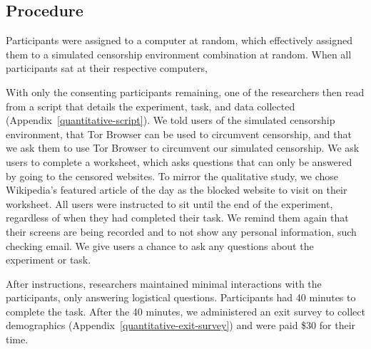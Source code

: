 \documentclass[USenglish,oneside,twocolumn]{article}
\begin{document}
\subsection{Procedure}
{\color {blue} 
Participants were assigned to a computer at random, which effectively assigned them to a simulated censorship environment combination at random. When all participants sat at their respective computers, 

With only the consenting participants remaining, one of the researchers then read from a script that details the experiment, task, and data collected (Appendix~\ref{quantitative-script}). We told users of the simulated censorship environment, that Tor Browser can be used to circumvent censorship, and that we ask them to use Tor Browser to circumvent our simulated censorship. We ask users to complete a worksheet, which asks questions that can only be answered by going to the censored websites. To mirror the qualitative study, we chose Wikipedia's featured article of the day as the blocked website to visit on their worksheet. All users were instructed to sit until the end of the experiment, regardless of when they had completed their task. We remind them again that their screens are being recorded and to not show any personal information, such checking email. We give users a chance to ask any questions about the experiment or task. 

After instructions, researchers maintained minimal interactions with the participants, only answering logistical questions. Participants had 40 minutes to complete the task. After the 40 minutes, we administered an exit survey to collect demographics (Appendix~\ref{quantitative-exit-survey}) and were paid \$30 for their time. 
}
\end{document}
